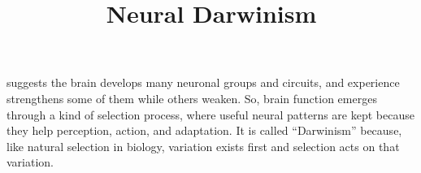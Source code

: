\documentclass[a4paper]{article}
\title{Neural Darwinism}
\date{}
\begin{document}
    \maketitle
     suggests the brain develops many neuronal groups and circuits, and experience strengthens some of them while others weaken.
    So, brain function emerges through a kind of selection process, where useful neural patterns are kept because they help perception, action, and adaptation. It is called “Darwinism” because, like natural selection in biology, variation exists first and selection acts on that variation.
\end{document}
